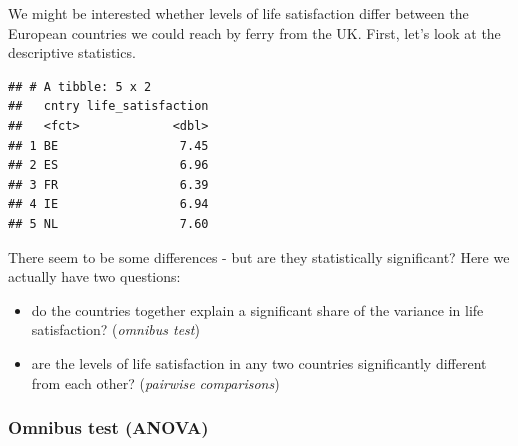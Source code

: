 \documentclass[
]{book}
\newenvironment{Shaded}{\begin{snugshade}}{\end{snugshade}}
\newcommand{\CommentTok}[1]{\textcolor[rgb]{0.56,0.35,0.01}{\textit{#1}}}
\newcommand{\DataTypeTok}[1]{\textcolor[rgb]{0.13,0.29,0.53}{#1}}
\newcommand{\KeywordTok}[1]{\textcolor[rgb]{0.13,0.29,0.53}{\textbf{#1}}}
\newcommand{\NormalTok}[1]{#1}
\newcommand{\OperatorTok}[1]{\textcolor[rgb]{0.81,0.36,0.00}{\textbf{#1}}}
\newcommand{\StringTok}[1]{\textcolor[rgb]{0.31,0.60,0.02}{#1}}
\providecommand{\tightlist}{%
  \setlength{\itemsep}{0pt}\setlength{\parskip}{0pt}}
\begin{document}
We might be interested whether levels of life satisfaction differ between the European countries we could reach by ferry from the UK. First, let's look at the descriptive statistics.

\begin{Shaded}
\end{Shaded}

\begin{verbatim}
## # A tibble: 5 x 2
##   cntry life_satisfaction
##   <fct>             <dbl>
## 1 BE                 7.45
## 2 ES                 6.96
## 3 FR                 6.39
## 4 IE                 6.94
## 5 NL                 7.60
\end{verbatim}

There seem to be some differences - but are they statistically significant? Here we actually have two questions:

\begin{itemize}
\tightlist
\item
  do the countries together explain a significant share of the variance in life satisfaction? (\emph{omnibus test})
\item
  are the levels of life satisfaction in any two countries significantly different from each other? (\emph{pairwise comparisons})
\end{itemize}

\hypertarget{omnibus-test-anova}{%
\subsubsection{Omnibus test (ANOVA)}\label{omnibus-test-anova}}

\begin{Shaded}
\end{Shaded}
\end{document}
